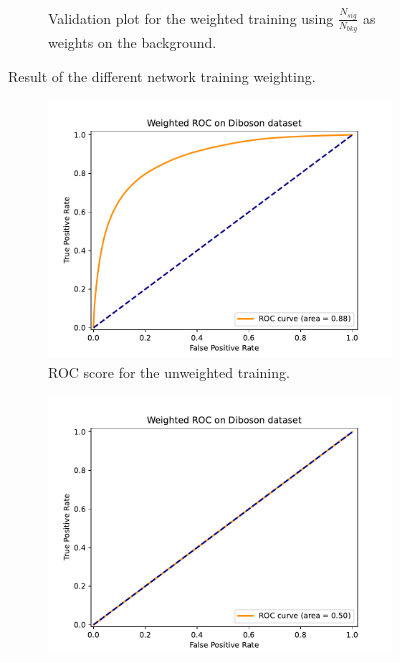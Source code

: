 \documentclass[14pt, a4paper]{book}
\begin{document}
\begin{figure}[!ht]
\begin{subfigure}[b]{0.49\textwidth}
        \caption{Validation plot for the weighted training using $\frac{N_{sig}}{N_{bkg}}$ as weights on the background.}\label{fig:DibosonVALW}
     \end{subfigure}
	\caption{Result of the different network training weighting.}\label{fig:DibosonVAL}
\end{figure}
\begin{figure}[!ht]
	\centering
	\begin{subfigure}[b]{0.49\textwidth}
        \centering
        \includegraphics[width=1\textwidth]{ROC_uw.pdf}
        \caption{ROC score for the unweighted training.}\label{fig:DibosonROCUW}
     \end{subfigure}
     \hfill
     \begin{subfigure}[b]{0.49\textwidth}
        \centering
        \includegraphics[width=1\textwidth]{ROC_mc.pdf}

\end{subfigure}
\end{figure}
\end{document}
